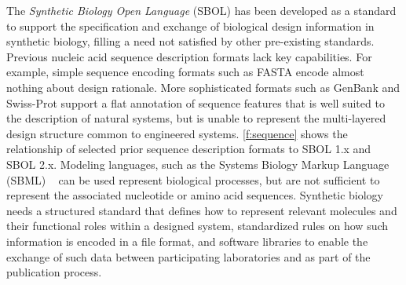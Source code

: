 The \emph{Synthetic Biology Open Language} (SBOL) has been developed as a standard to support the specification and exchange of biological design information in synthetic biology, filling a need not satisfied by other pre-existing standards.
Previous nucleic acid sequence description formats lack key capabilities. For example,  simple sequence encoding formats such as FASTA encode almost nothing about design rationale. More sophisticated formats such as GenBank and Swiss-Prot support a flat annotation of sequence features that is well suited to the  description of natural systems, but is unable to represent the multi-layered design structure common to engineered systems.
\ref{f:sequence} shows the relationship of selected prior sequence description formats to SBOL 1.x and SBOL 2.x.
Modeling languages, such as the Systems Biology Markup Language (SBML) ~\cite{SBML} can be used represent biological processes, but are not sufficient to represent the associated nucleotide or amino acid sequences.  %
Synthetic biology needs a structured standard that defines how to represent relevant molecules and their functional roles within a designed system, standardized rules on how such information is encoded in a file format, and software libraries to enable the exchange of such data between participating laboratories and as part of the publication process. 

